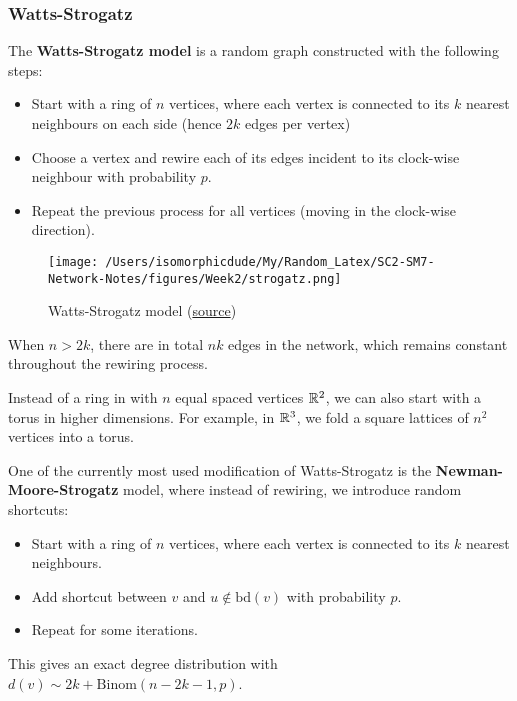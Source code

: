 \documentclass{article}
\begin{document}
\subsubsection{Watts-Strogatz}
The \textbf{Watts-Strogatz model} is a random graph constructed with the following steps:
\begin{itemize}
    \item Start with a ring of $n$ vertices, where each vertex is connected to its $k$ nearest neighbours on each side (hence $2k$ edges per vertex)
    \item Choose a vertex and rewire each of its edges incident to its clock-wise neighbour with probability $p$.
    \item Repeat the previous process for all vertices (moving in the clock-wise direction).
\end{itemize}

\begin{figure}[H]
    \centering
    \texttt{[image: /Users/isomorphicdude/My/Random\_Latex/SC2-SM7-Network-Notes/figures/Week2/strogatz.png]}
    \caption{Watts-Strogatz model (\href{https://www.kth.se}{source})} %
    \label{fig:watts-strogatz}
\end{figure}

When $n>2k$, there are in total $nk$ edges in the network, which remains constant throughout the rewiring process.

\begin{remark}
    Instead of a ring in with $n$ equal spaced vertices $\mathbb{R}^2$, we can also start with a torus in higher dimensions. For example, in $\mathbb{R}^3$, we fold a square lattices of $n^2$ vertices into a torus.
\end{remark}  

One of the currently most used modification of Watts-Strogatz is the \textbf{Newman-Moore-Strogatz} model, where instead of rewiring, we introduce random shortcuts:
\begin{itemize}
    \item Start with a ring of $n$ vertices, where each vertex is connected to its $k$ nearest neighbours.
    \item Add shortcut between $v$ and $u\notin \text{bd}(v)$ with probability $p$.
    \item Repeat for some iterations.
\end{itemize}

This gives an exact degree distribution with $d(v) \sim 2k+\mathrm{Binom}(n-2k-1, p)$.
\end{document}
